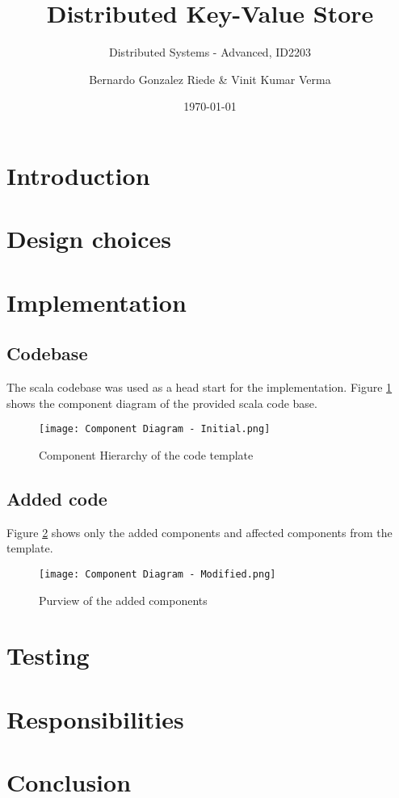 \documentclass[a4paper]{scrartcl}
\title{Distributed Key-Value Store}
\subtitle{Distributed Systems - Advanced, ID2203}
\author{Bernardo Gonzalez Riede \& Vinit Kumar Verma}
\date{\today}
\begin{document}
\maketitle

\section{Introduction}


\section{Design choices}


\section{Implementation}

\subsection{Codebase}
The scala codebase was used as a head start for the implementation.
Figure \ref{fig:initial} shows the component diagram of the provided scala code base. 

\begin{figure}[h!]
  \begin{center}
    \texttt{[image: Component Diagram - Initial.png]}
    \caption{Component Hierarchy of the code template}
    \label{fig:initial}
  \end{center}
\end{figure}

\subsection{Added code}
Figure \ref{fig:modified} shows only the added components and affected components from the template.

\begin{figure}[h!]
  \begin{center}
    \texttt{[image: Component Diagram - Modified.png]}
    \caption{Purview of the added components}
    \label{fig:modified}
  \end{center}
\end{figure}

\section{Testing}


\section{Responsibilities}


\section{Conclusion}
\end{document}
